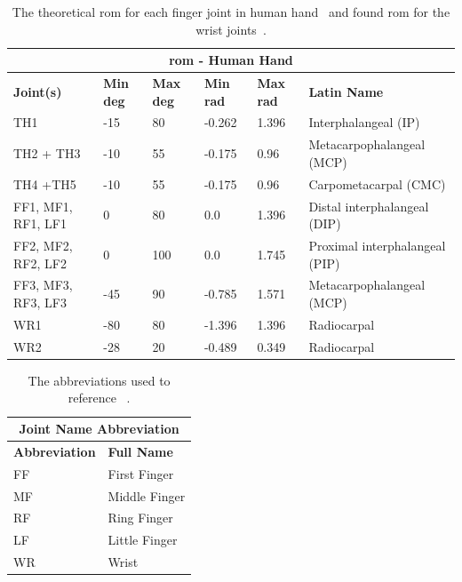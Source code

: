 \begin{table}[!h]
	\begin{center}
		\begin{tabular}{ |p{}|p{}|p{}|p{}|p{}|p{}| } 
		\hline
		\multicolumn{6}{|c|}{\textbf{\gls{rom} - Human Hand}} \\ \hline
		\textbf{Joint(s)} & \textbf{Min deg} & \textbf{Max deg} & \textbf{Min rad} & \textbf{Max rad} & \textbf{Latin Name} \\ \hline
		TH1                & -15 & 80  & -0.262 & 1.396 & Interphalangeal (IP) \\ \hline
		TH2 + TH3          & -10 & 55  & -0.175 & 0.96 & Metacarpophalangeal (MCP)\\ \hline
		TH4 +TH5           & -10 & 55  & -0.175 & 0.96 & Carpometacarpal (CMC)\\ \hline
		FF1, MF1, RF1, LF1 & 0   & 80  & 0.0 & 1.396 & Distal interphalangeal (DIP) \\ \hline
		FF2, MF2, RF2, LF2 & 0   & 100 & 0.0 & 1.745 & Proximal interphalangeal (PIP) \\ \hline
		FF3, MF3, RF3, LF3 & -45 & 90  & -0.785 & 1.571 & Metacarpophalangeal (MCP) \\ \hline
		WR1                &-80  & 80  & -1.396 & 1.396 & Radiocarpal \\ \hline
		WR2                &-28  & 20  & -0.489 & 0.349 & Radiocarpal \\ \hline
		\end{tabular}
		\caption{The theoretical \gls{rom} for each finger joint in human hand~\cite{continuous-and-simultaneous-estimation-of-finger-kinematics-using-inputs-from-an-emg-to-muscle-activation-model} and found \gls{rom} for the wrist joints~\cite{functional-wrist-motion:-a-biomechanical-study}.}
		\label{app:range-of-motion-human-hand}
	\end{center}
\end{table}
\newpage
\begin{table}[!h]
	\begin{center}
		\begin{tabular}{ |l|l| } 
		\hline
		\multicolumn{2}{|c|}{\textbf{Joint Name Abbreviation}} \\ \hline
		\textbf{Abbreviation} & \textbf{Full Name} \\ \hline
		FF & First Finger \\ \hline 
		MF & Middle Finger \\ \hline 
		RF & Ring Finger \\ \hline 
		LF & Little Finger \\ \hline 
		WR & Wrist \\ \hline 
		\end{tabular}
		\caption{The abbreviations used to reference ~\cite{joint-abbreviations-shadow-hand}.}
		\label{app:joint-abbreviations}
	\end{center}
	\end{table}

